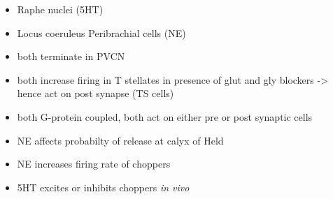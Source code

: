 \begin{itemize}
\item Raphe nuclei (5HT)
\item Locus coeruleus Peribrachial cells (NE)
\item both terminate in PVCN \citep{KlepperHerbert:1991,Thompson:2003,ThompsonLauder:2005,Thompson:2003a,ThompsonWiechmann:2002,BehrensSchofieldEtAl:2002,ThompsonThompson:2001,ThompsonThompson:2001a,ThompsonMooreEtAl:1995,ThompsonThompsonEtAl:1994}
\item both increase firing in T stellates \citep{OertelWrightEtAl:2010} in presence of glut and gly blockers -> hence act on post synapse (TS cells)
\item both G-protein coupled, both act on either pre or post synaptic cells
\item NE affects probabilty of release at calyx of Held
\item NE increases firing rate of choppers \citep{KosslVater:1989,Ebert:1996}
\item 5HT excites or inhibits choppers \emph{in vivo} \citep{EbertOstwald:1992}
\end{itemize}


